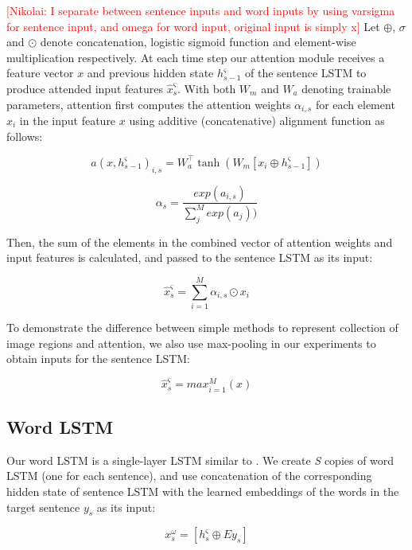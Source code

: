 \documentclass[11pt,a4paper]{article}
\newcommand{\kibitz}[2]{\ifnum\Comments=1\textcolor{#1}{#2}\fi}
\newcommand{\nikolai}[1]{\kibitz{red}      {[Nikolai: #1]}}
\begin{document}
\nikolai{I separate between sentence inputs and word inputs by using varsigma for sentence input, and omega for word input, original input is simply x}
Let $\oplus$, $\sigma$ and $\odot$ denote concatenation, logistic sigmoid function and element-wise multiplication respectively.
At each time step our attention module receives a feature vector $x$ and previous hidden state $h^\varsigma_{s-1}$ of the sentence LSTM to produce attended input features $\hat{x}^\varsigma_s$.
With both $W_m$ and $W_a$ denoting trainable parameters, attention first computes the attention weights $\alpha_{i,s}$ for each element $x_i$ in the input feature $x$ using additive (concatenative) alignment function as follows:

\begin{equation}
    a(x, h^\varsigma_{s-1})_{i,s} = W_a^\top \tanh (W_m[x_i \oplus h^\varsigma_{s-1}])
\end{equation}

\begin{equation}
    \alpha_s = \frac{exp(a_{i,s})}{\sum_{j}^{M}exp(a_j))}
\end{equation}

Then, the sum of the elements in the combined vector of attention weights and input features is calculated, and passed to the sentence LSTM as its input:

\begin{equation}
    \hat{x}^\varsigma_s = \sum_{i=1}^{M} \alpha_{i,s} \odot x_i
\end{equation}

To demonstrate the difference between simple methods to represent collection of image regions and attention, we also use max-pooling in our experiments to obtain inputs for the sentence LSTM:

\begin{equation}
    \hat{x}^\varsigma_s =  max_{i=1}^M(x)
\end{equation}

\subsection{Word LSTM}
Our word LSTM is a single-layer LSTM similar to .
We create \textit{S} copies of word LSTM (one for each sentence), and use concatenation of the corresponding hidden state of sentence LSTM with the learned embeddings of the words in the target sentence $y_s$ as its input:

\begin{equation}
   x^\omega_s = [h^\varsigma_s \oplus Ey_s ]
\end{equation}
\end{document}
